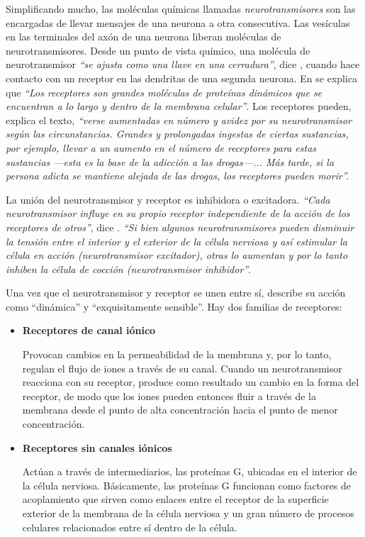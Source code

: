 Simplificando mucho, las moléculas químicas llamadas  {\it neurotransmisores} son las encargadas de llevar mensajes de una neurona a otra consecutiva. Las vesículas en las terminales del axón de una neurona liberan moléculas de neurotransmisores. Desde un punto de vista químico, una molécula de neurotransmisor {\it ``se ajusta como una llave en una cerradura''}, dice \cite{Sapolsky}, cuando hace contacto con un receptor en las dendritas de una segunda neurona. En \cite{Restak1995} se explica que {\it ``Los receptores son grandes moléculas de proteínas dinámicos que se encuentran a lo largo y dentro de la membrana celular''}. Los receptores pueden, explica el texto, {\it ``verse aumentadas en número y avidez por su neurotransmisor según las circunstancias. Grandes y prolongadas ingestas de ciertas sustancias, por ejemplo, llevar a un aumento en el número de receptores para estas sustancias ---esta es la base de la adicción a las drogas---... Más tarde, si la persona adicta se mantiene alejada de las drogas, los receptores pueden morir''.}

La unión del neurotransmisor y receptor es inhibidora o excitadora. {\it ``Cada neurotransmisor influye en su propio receptor independiente de la acción de los receptores de otros''}, dice \cite{Restak1995}. {\it ``Si bien algunos neurotransmisores pueden disminuir la tensión entre el interior y el exterior de la célula nerviosa y así estimular la célula en acción (neurotransmisor excitador), otras lo aumentan y por lo tanto inhiben la célula de cocción (neurotransmisor inhibidor''}.

Una vez que el  neurotransmisor y receptor se unen entre sí, \cite{Restak1995} describe su acción como ``dinámica'' y ``exquisitamente sensible''. Hay dos familias de receptores: 

\begin{itemize}

\item {\bf Receptores de canal iónico}

Provocan cambios en la permeabilidad de la membrana y, por lo tanto, regulan el flujo de iones a través de su canal. Cuando un  neurotransmisor reacciona con su receptor, produce como resultado un cambio en la forma del receptor, de modo que los iones pueden entonces fluir a través de la membrana desde el punto de alta concentración hacia el punto de menor concentración.

\item {\bf Receptores sin canales iónicos}

Actúan a través de intermediarios, las proteínas G, ubicadas en el interior de la célula nerviosa. Básicamente, las proteínas G funcionan como factores de acoplamiento que sirven como enlaces entre el receptor de la superficie exterior de la membrana de la célula nerviosa y un gran número de procesos celulares relacionados entre sí dentro de la célula.

\end{itemize}

